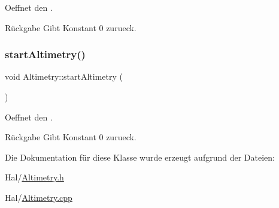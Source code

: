 Oeffnet den .

\begin{DoxyReturn}{Rückgabe}
Gibt Konstant 0 zurueck. 
\end{DoxyReturn}
\hypertarget{class_altimetry_acf39bd22b3d28f8bd41828d2faec3440}{}\label{class_altimetry_acf39bd22b3d28f8bd41828d2faec3440} 
\subsubsection{\texorpdfstring{start\+Altimetry()}{startAltimetry()}}
{\footnotesize\ttfamily void Altimetry\+::start\+Altimetry (\begin{DoxyParamCaption}{ }\end{DoxyParamCaption})}

Oeffnet den .

\begin{DoxyReturn}{Rückgabe}
Gibt Konstant 0 zurueck. 
\end{DoxyReturn}


Die Dokumentation für diese Klasse wurde erzeugt aufgrund der Dateien\+:\begin{DoxyCompactItemize}
\item 
Hal/\hyperlink{_altimetry_8h}{Altimetry.\+h}\item 
Hal/\hyperlink{_altimetry_8cpp}{Altimetry.\+cpp}\end{DoxyCompactItemize}
